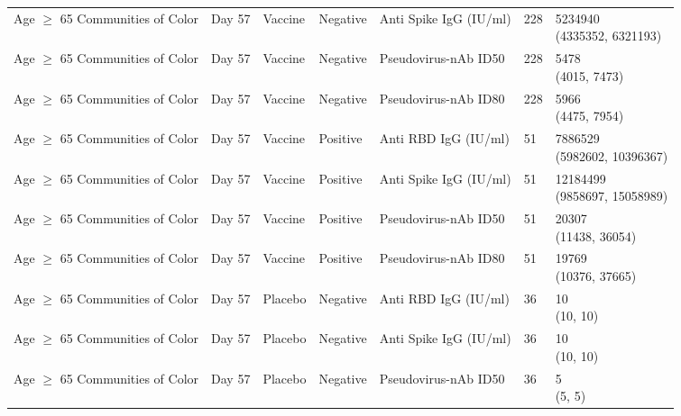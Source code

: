 \documentclass[]{book}
\theoremstyle{definition}
\theoremstyle{definition}
\theoremstyle{definition}
\newcommand{\1}{\mathbbm{1}}
\begin{document}
\begin{landscape}
\begin{ThreePartTable}
\begin{longtable}[t]{>{\raggedright\arraybackslash}p{7cm}llllll}
\hspace{1em}Age $\geq$ 65 Communities of Color & Day 57 & Vaccine & Negative & Anti Spike IgG (IU/ml) & 228 & \makecell[l]{5234940\\(4335352, 6321193)}\\
\hspace{1em}Age $\geq$ 65 Communities of Color & Day 57 & Vaccine & Negative & Pseudovirus-nAb ID50 & 228 & \makecell[l]{5478\\(4015, 7473)}\\
\hspace{1em}Age $\geq$ 65 Communities of Color & Day 57 & Vaccine & Negative & Pseudovirus-nAb ID80 & 228 & \makecell[l]{5966\\(4475, 7954)}\\
\hspace{1em}Age $\geq$ 65 Communities of Color & Day 57 & Vaccine & Positive & Anti RBD IgG (IU/ml) & 51 & \makecell[l]{7886529\\(5982602, 10396367)}\\
\hspace{1em}Age $\geq$ 65 Communities of Color & Day 57 & Vaccine & Positive & Anti Spike IgG (IU/ml) & 51 & \makecell[l]{12184499\\(9858697, 15058989)}\\
\hspace{1em}Age $\geq$ 65 Communities of Color & Day 57 & Vaccine & Positive & Pseudovirus-nAb ID50 & 51 & \makecell[l]{20307\\(11438, 36054)}\\
\hspace{1em}Age $\geq$ 65 Communities of Color & Day 57 & Vaccine & Positive & Pseudovirus-nAb ID80 & 51 & \makecell[l]{19769\\(10376, 37665)}\\
\hspace{1em}Age $\geq$ 65 Communities of Color & Day 57 & Placebo & Negative & Anti RBD IgG (IU/ml) & 36 & \makecell[l]{10\\(10, 10)}\\
\hspace{1em}Age $\geq$ 65 Communities of Color & Day 57 & Placebo & Negative & Anti Spike IgG (IU/ml) & 36 & \makecell[l]{10\\(10, 10)}\\
\hspace{1em}Age $\geq$ 65 Communities of Color & Day 57 & Placebo & Negative & Pseudovirus-nAb ID50 & 36 & \makecell[l]{5\\(5, 5)}\\

\end{longtable}
\end{ThreePartTable}
\end{landscape}
\end{document}
